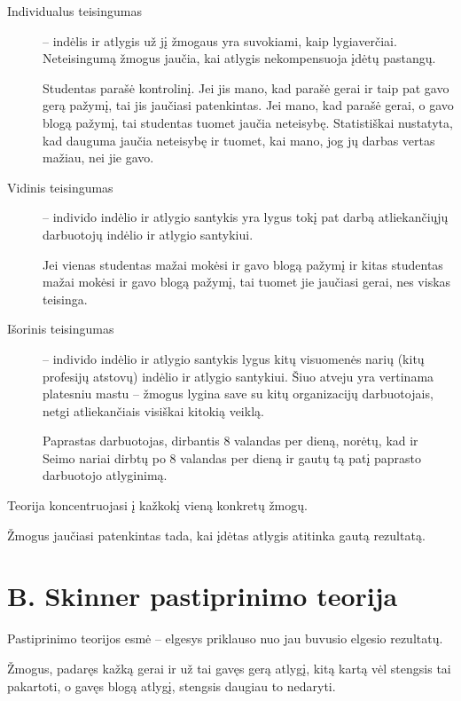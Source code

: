 \begin{description}
  \item[Individualus teisingumas] – indėlis ir atlygis už jį žmogaus
    yra suvokiami, kaip lygiaverčiai. Neteisingumą žmogus jaučia,
    kai atlygis nekompensuoja įdėtų pastangų.
    \begin{exmp}
      Studentas parašė kontrolinį. Jei jis mano, kad parašė gerai ir
      taip pat gavo gerą pažymį, tai jis jaučiasi patenkintas. Jei
      mano, kad parašė gerai, o gavo blogą pažymį, tai studentas tuomet
      jaučia neteisybę. Statistiškai nustatyta, kad dauguma jaučia
      neteisybę ir tuomet, kai mano, jog jų darbas vertas mažiau, nei
      jie gavo.
    \end{exmp}
  \item[Vidinis teisingumas] – individo indėlio ir atlygio santykis yra
    lygus tokį pat darbą atliekančiųjų darbuotojų indėlio ir atlygio
    santykiui.
    \begin{exmp}
      Jei vienas studentas mažai mokėsi ir gavo blogą
      pažymį ir kitas studentas mažai mokėsi ir gavo blogą pažymį, tai
      tuomet jie jaučiasi gerai, nes viskas teisinga.
    \end{exmp}
  \item[Išorinis teisingumas] – individo indėlio ir atlygio santykis
    lygus kitų visuomenės narių (kitų profesijų atstovų) indėlio
    ir atlygio santykiui. Šiuo atveju yra vertinama platesniu mastu
    – žmogus lygina save su kitų organizacijų darbuotojais, netgi
    atliekančiais visiškai kitokią veiklą.
    \begin{exmp}
      Paprastas darbuotojas, dirbantis 8 valandas per dieną, norėtų, kad
      ir Seimo nariai dirbtų po 8 valandas per dieną ir gautų tą patį
      paprasto darbuotojo atlyginimą.
    \end{exmp}
\end{description}

Teorija koncentruojasi į kažkokį vieną konkretų žmogų.

Žmogus jaučiasi patenkintas tada, kai įdėtas atlygis atitinka gautą
rezultatą.

\section{B. Skinner pastiprinimo teorija}

Pastiprinimo teorijos esmė – elgesys priklauso nuo jau buvusio elgesio
rezultatų.

\begin{exmp}
  Žmogus, padaręs kažką gerai ir už tai gavęs gerą atlygį, kitą kartą
  vėl stengsis tai pakartoti, o gavęs blogą atlygį, stengsis daugiau
  to nedaryti.
\end{exmp}

